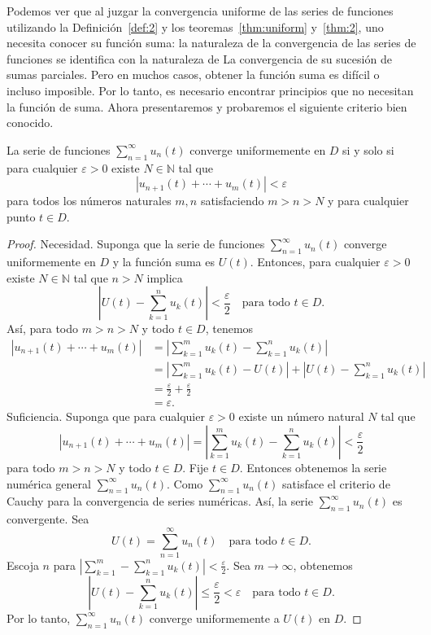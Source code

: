 Podemos ver que al juzgar la convergencia uniforme de las series de funciones utilizando la Definición~\ref{def:2} y los teoremas~\ref{thm:uniform} y~\ref{thm:2}, uno necesita conocer su función suma: la naturaleza de la convergencia de las series de funciones se identifica con la naturaleza de La convergencia de su sucesión de sumas parciales. Pero en muchos casos, obtener la función suma es difícil o incluso imposible. Por lo tanto, es necesario encontrar principios que no necesitan la función de suma. Ahora presentaremos y probaremos el siguiente criterio bien conocido.

\begin{theorem}\label{thm:cauchy}
	La serie de funciones $\sum_{n=1}^{\infty}u_{n}\left(t\right)$ converge uniformemente en $D$ si y solo si para cualquier $\varepsilon>0$ existe $N\in\mathds{N}$ tal que \[ \left|u_{n+1}\left(t\right)+\cdots+u_{m}\left(t\right)\right|<\varepsilon \] para todos los números naturales $m,n$ satisfaciendo $m>n>N$ y para cualquier punto $t\in D$.
\end{theorem}
\begin{proof}
	Necesidad. Suponga que la serie de funciones $\sum_{n=1}^{\infty}u_{n}\left(t\right)$ converge uniformemente en $D$ y la función suma es $U\left(t\right)$. Entonces, para cualquier $\varepsilon>0$ existe $N\in\mathds{N}$ tal que $n>N$ implica \[ \left|U\left(t\right)-\sum_{k=1}^{n}u_{k}\left(t\right)\right|<\frac{\varepsilon}{2}\quad\text{para todo }t\in D. \] Así, para todo $m>n>N$ y todo $t\in D$, tenemos
	\begin{align*}
	\left|u_{n+1}\left(t\right)+\cdots+u_{m}\left(t\right)\right|
	&=\left|\sum_{k=1}^{m}u_{k}\left(t\right)-\sum_{k=1}^{n}u_{k}\left(t\right)\right|\\
	&=\left|\sum_{k=1}^{m}u_{k}\left(t\right)-U\left(t\right)\right|+\left|U\left(t\right)-\sum_{k=1}^{n}u_{k}\left(t\right)\right|\\
	&=\frac{\varepsilon}{2}+\frac{\varepsilon}{2}\\
	&=\varepsilon.
	\end{align*}
	Suficiencia. Suponga que para cualquier $\varepsilon>0$ existe un número natural $N$ tal que \[ \left|u_{n+1}\left(t\right)+\cdots+u_{m}\left(t\right)\right|=\left|\sum_{k=1}^{m}u_{k}\left(t\right)-\sum_{k=1}^{n}u_{k}\left(t\right)\right|<\frac{\varepsilon}{2} \] para todo $m>n>N$ y todo $t\in D$. Fije $t\in D$. Entonces obtenemos la serie numérica general $\sum_{n=1}^{\infty}u_{n}\left(t\right)$. Como $\sum_{n=1}^{\infty}u_{n}\left(t\right)$ satisface el criterio de Cauchy para la convergencia de series numéricas. Así, la serie $\sum_{n=1}^{\infty}u_{n}\left(t\right)$ es convergente. Sea \[ U\left(t\right)=\sum_{n=1}^{\infty}u_{n}\left(t\right)\quad\text{para todo }t\in D. \] Escoja $n$ para $\left|\sum_{k=1}^{m}-\sum_{k=1}^{n}u_{k}\left(t\right)\right|<\frac{\varepsilon}{2}$. Sea $m\to\infty$, obtenemos \[ \left|U\left(t\right)-\sum_{k=1}^{n}u_{k}\left(t\right)\right|\leq\frac{\varepsilon}{2}<\varepsilon\quad\text{para todo }t\in D. \] Por lo tanto, $\sum_{n=1}^{\infty}u_{n}\left(t\right)$ converge uniformemente a $U\left(t\right)$ en $D$.
\end{proof}

